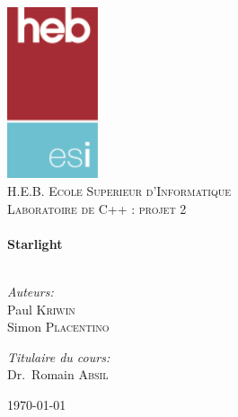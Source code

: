 \begin{titlepage}
	\begin{center}

		\includegraphics[keepaspectratio=true,width=0.20\textwidth]{./logo}\\[1cm]

		\textsc{\LARGE H.E.B. Ecole Superieur d'Informatique}\\[1.5cm]

		\textsc{\Large Laboratoire de C++ : projet 2}\\[0.5cm]

		\HRule \\[0.4cm]
		{\huge \bfseries Starlight \\[0.4cm]}
		\HRule \\[1.5cm]

		\noindent
		\begin{minipage}[t]{0.4\textwidth}
			\begin{flushleft} \large
				\emph{Auteurs:}\\
				Paul \textsc{Kriwin}\\
				Simon \textsc{Placentino}
			\end{flushleft}
		\end{minipage}%
		\begin{minipage}[t]{0.4\textwidth}
			\begin{flushright} \large
				\emph{Titulaire du cours:} \\
				Dr.~Romain \textsc{Absil}
			\end{flushright}
		\end{minipage}

		\vfill

		{\large \today}

	\end{center}
\end{titlepage}
